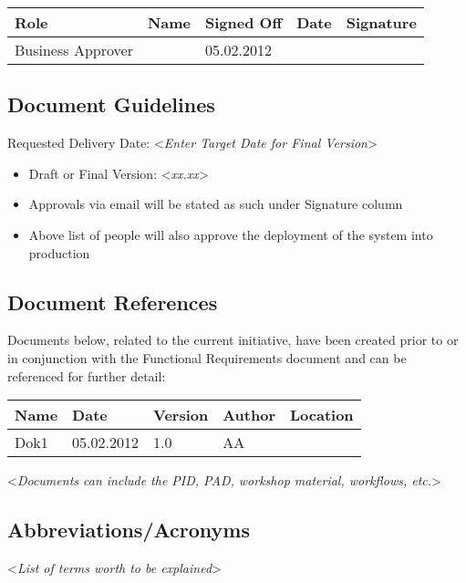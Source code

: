 \documentclass[english,12pt]{scrartcl}
\newcommand{\comment}[1]{\textless\textit{#1}\textgreater\vspace*{1ex}}
\begin{document}
\begin{tabular}{p{}p{}p{}p{}p{}} \toprule
Role&Name&Signed Off& Date & Signature \\ \midrule
Business Approver & & 05.02.2012 & \\ \bottomrule
\end{tabular}		
 
 
\subsection{Document Guidelines}
 
Requested Delivery Date: \comment{Enter Target Date for Final Version} 
 
 
\begin{itemize}
\item Draft or Final Version: \comment{xx.xx}
\item Approvals via email will be stated as such under Signature column
\item Above list of people will also approve the deployment of the system into production
\end{itemize}
 
\subsection{Document References}
 
Documents below, related to the current initiative, have been created prior to or in conjunction with the Functional Requirements document and can be referenced for further detail:
 
\begin{tabular}{p{}p{}p{}p{}p{}} \toprule
Name &Date&Version & Author & Location \\ \midrule
Dok1 & 05.02.2012 & 1.0 & AA & \\ \bottomrule
\end{tabular}		
 
\comment{Documents can include the PID, PAD, workshop material, workflows, etc.}
 
 
\subsection{Abbreviations/Acronyms}
 
\comment{List of terms worth to be explained}
 
\end{document}
